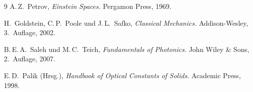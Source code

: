 ﻿\documentclass[12pt, a4paper]{article}
\theoremstyle{definition}
\begin{document}
\begin{thebibliography}{9}
		A.\,Z.~Petrov,
		\newblock \emph{Einstein Spaces.}
		\newblock Pergamon Press, 1969.
		
		H.~Goldstein, C.\,P.~Poole und J.\,L.~Safko,
		\newblock \emph{Classical Mechanics.}
		\newblock Addison-Wesley, 3.~Auflage, 2002.
		
		B.\,E.\,A.~Saleh und M.\,C.~Teich,
		\newblock \emph{Fundamentals of Photonics.}
		\newblock John Wiley \& Sons, 2.~Auflage, 2007.
		
		E.\,D.~Palik (Hrsg.),
		\newblock \emph{Handbook of Optical Constants of Solids.}
		\newblock Academic Press, 1998.
		
	\end{thebibliography}
	
\end{document}
